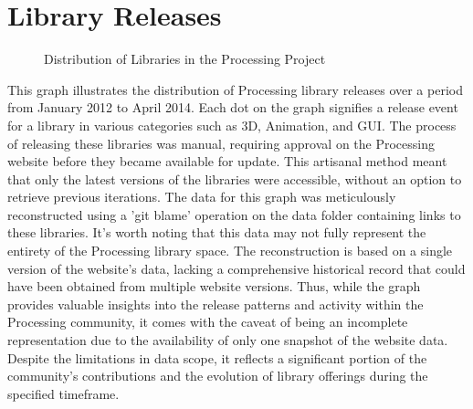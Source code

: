 \cleardoublepage
\changepapersize{305.3mm:210mm}

\thispagestyle{empty}
\begingroup
\raggedright 
{}
\section*{Library Releases} 
\fontsize{12pt}{14pt}\selectfont
{}
\endgroup

\newpage
{}


\begin{figure}[H]
	
	\vspace{3pt}
	\caption{Distribution of Libraries in the Processing Project}
	\label{figure:libraries}
\end{figure}

\begin{multicols}{3}
	\noindent
	This graph illustrates the distribution of Processing library releases over a period from January 2012 to April 2014. Each dot on the graph signifies a release event for a library in various categories such as 3D, Animation, and GUI. The process of releasing these libraries was manual, requiring approval on the Processing website before they became available for update. This artisanal method meant that only the latest versions of the libraries were accessible, without an option to retrieve previous iterations.
	\noindent
	The data for this graph was meticulously reconstructed using a 'git blame' operation on the data folder containing links to these libraries. It's worth noting that this data may not fully represent the entirety of the Processing library space. The reconstruction is based on a single version of the website's data, lacking a comprehensive historical record that could have been obtained from multiple website versions. Thus, while the graph provides valuable insights into the release patterns and activity within the Processing community, it comes with the caveat of being an incomplete representation due to the availability of only one snapshot of the website data.
	\noindent
	 Despite the limitations in data scope, it reflects a significant portion of the community's contributions and the evolution of library offerings during the specified timeframe.
\end{multicols}
